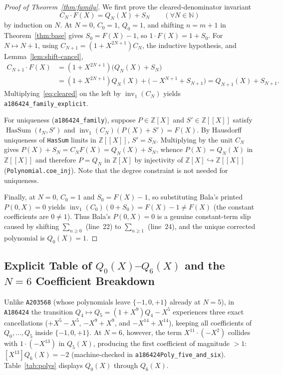 \documentclass[11pt]{article}
\newcommand{\llbracket}{[\![}
\newcommand{\rrbracket}{]\!]}
\theoremstyle{definition}
\newcommand{\N}{\mathbb{N}}
\newcommand{\Z}{\mathbb{Z}}
\newcommand{\seq}[1]{\texttt{#1}}
\newcommand{\inv}{\operatorname{inv}_1}
\begin{document}
\begin{proof}[Proof of Theorem~\ref{thm:family}]
We first prove the cleared-denominator invariant
\begin{equation}
\label{eq:cleared}
C_N \cdot F(X) = Q_N(X) + S_N \qquad (\forall N \in \N)
\end{equation}
by induction on $N$. At $N = 0$, $C_0 = 1$, $Q_0 = 1$, and shifting $n = m + 1$ in Theorem~\ref{thm:base} gives $S_0 = F(X) - 1$, so $1 \cdot F(X) = 1 + S_0$. For $N \mapsto N + 1$, using $C_{N+1} = (1 + X^{2N+1}) C_N$, the inductive hypothesis, and Lemma~\ref{lem:shift-cancel},
\begin{align*}
C_{N+1} \cdot F(X)
&= (1 + X^{2N+1}) \bigl(Q_N(X) + S_N\bigr) \\
&= (1 + X^{2N+1}) Q_N(X) + \bigl(-X^{N+1} + S_{N+1}\bigr)
= Q_{N+1}(X) + S_{N+1}.
\end{align*}
Multiplying~\eqref{eq:cleared} on the left by $\inv(C_N)$ yields \texttt{a186424\_family\_explicit}.

For uniqueness (\texttt{a186424\_family}), suppose $P \in \Z[X]$ and $S' \in \Z\llbracket X \rrbracket$ satisfy $\operatorname{HasSum}(t_N, S')$ and $\inv(C_N)(P(X) + S') = F(X)$. By Hausdorff uniqueness of \texttt{HasSum} limits in $\Z\llbracket X \rrbracket$, $S' = S_N$. Multiplying by the unit $C_N$ gives $P(X) + S_N = C_N F(X) = Q_N(X) + S_N$, whence $P(X) = Q_N(X)$ in $\Z\llbracket X \rrbracket$ and therefore $P = Q_N$ in $\Z[X]$ by injectivity of $\Z[X] \hookrightarrow \Z\llbracket X \rrbracket$ (\texttt{Polynomial.coe\_inj}). Note that the degree constraint is not needed for uniqueness.

Finally, at $N = 0$, $C_0 = 1$ and $S_0 = F(X) - 1$, so substituting Bala's printed $P(0, X) = 0$ yields $\inv(C_0)(0 + S_0) = F(X) - 1 \ne F(X)$ (the constant coefficients are $0 \ne 1$). Thus Bala's $P(0, X) = 0$ is a genuine constant-term slip caused by shifting $\sum_{n \ge 0}$ (line~22) to $\sum_{n \ge 1}$ (line~24), and the unique corrected polynomial is $Q_0(X) = 1$.
\end{proof}

\subsection{Explicit Table of \texorpdfstring{$Q_0(X)$--$Q_6(X)$}{Q0--Q6} and the \texorpdfstring{$N = 6$}{N = 6} Coefficient Breakdown}

Unlike \seq{A203568} (whose polynomials leave $\{-1, 0, +1\}$ already at $N = 5$), in \seq{A186424} the transition $Q_4 \mapsto Q_5 = (1 + X^9) Q_4 - X^5$ experiences three exact cancellations ($+X^5 - X^5$, $-X^9 + X^9$, and $-X^{14} + X^{14}$), keeping all coefficients of $Q_0, \dots, Q_5$ inside $\{-1, 0, +1\}$. At $N = 6$, however, the term $X^{11} \cdot (-X^2)$ collides with $1 \cdot (-X^{13})$ in $Q_5(X)$, producing the first coefficient of magnitude $> 1$: $[X^{13}] Q_6(X) = -2$ (machine-checked in \texttt{a186424Poly\_five\_and\_six}). Table~\ref{tab:polys} displays $Q_0(X)$ through $Q_6(X)$.
\end{document}
